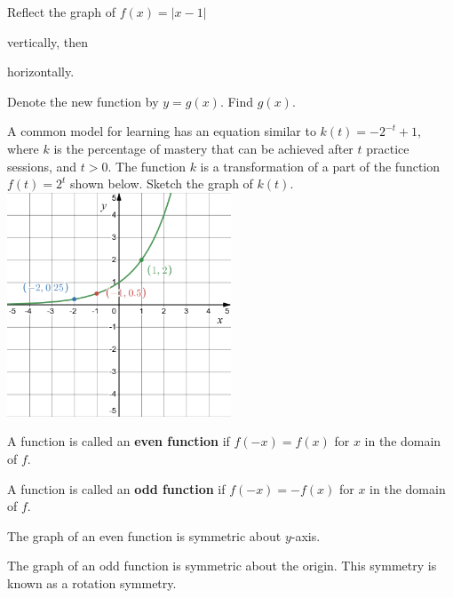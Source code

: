 \begin{example}
  Reflect the graph of \(f(x)=|x-1|\)\\
  \begin{enumerate*}
    \item vertically, then
    \item horizontally.\hfill\mbox{}
  \end{enumerate*}

Denote the new function by $y=g(x)$. Find $g(x)$.
\end{example}

\begin{example}
  A common model for learning has an equation similar to \(k(t)=-2^{-t}+1\), where \(k\) is the percentage of mastery that can be achieved after \(t\) practice sessions, and $t>0$. The function $k$ is a transformation of a part of the function \(f(t)=2^t\) shown below. Sketch the graph of \(k(t)\).\\
\includegraphics[width=0.5\textwidth]{figs/learningmodel.png}
\end{example}
\vspace*{-0.4\textheight}

\newpage

\begin{definition}
  A function is called an \textbf{even function} if $f(-x)=f(x)$ for $x$ in the domain of $f$.
  
  A function is called an \textbf{odd function} if $f(-x)=-f(x)$ for $x$ in the domain of $f$.
\end{definition}

\begin{remark}
  The graph of an even function is symmetric about $y$-axis.

  The graph of an odd function is symmetric about the origin. This symmetry is known as a rotation symmetry.
\end{remark}

